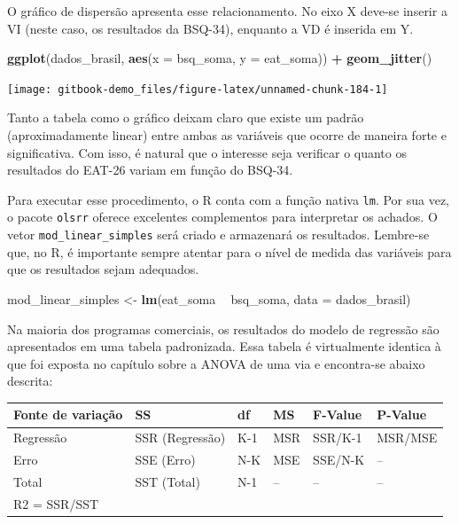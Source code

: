 \documentclass[
]{book}
\newenvironment{Shaded}{\begin{snugshade}}{\end{snugshade}}
\newcommand{\DataTypeTok}[1]{\textcolor[rgb]{0.13,0.29,0.53}{#1}}
\newcommand{\KeywordTok}[1]{\textcolor[rgb]{0.13,0.29,0.53}{\textbf{#1}}}
\newcommand{\NormalTok}[1]{#1}
\newcommand{\OperatorTok}[1]{\textcolor[rgb]{0.81,0.36,0.00}{\textbf{#1}}}
\newcommand{\StringTok}[1]{\textcolor[rgb]{0.31,0.60,0.02}{#1}}
\begin{document}
O gráfico de dispersão apresenta esse relacionamento. No eixo X deve-se inserir a VI (neste caso, os resultados da BSQ-34), enquanto a VD é inserida em Y.

\begin{Shaded}
\begin{Highlighting}[]
\KeywordTok{ggplot}\NormalTok{(dados_brasil, }\KeywordTok{aes}\NormalTok{(}\DataTypeTok{x =}\NormalTok{ bsq_soma, }\DataTypeTok{y =}\NormalTok{ eat_soma)) }\OperatorTok{+}
\StringTok{  }\KeywordTok{geom_jitter}\NormalTok{()}
\end{Highlighting}
\end{Shaded}

\begin{center}\texttt{[image: gitbook-demo\_files/figure-latex/unnamed-chunk-184-1]} \end{center}

Tanto a tabela como o gráfico deixam claro que existe um padrão (aproximadamente linear) entre ambas as variáveis que ocorre de maneira forte e significativa. Com isso, é natural que o interesse seja verificar o quanto os resultados do EAT-26 variam em função do BSQ-34.

Para executar esse procedimento, o R conta com a função nativa \texttt{lm}. Por sua vez, o pacote \texttt{olsrr} oferece excelentes complementos para interpretar os achados. O vetor \texttt{mod\_linear\_simples} será criado e armazenará os resultados. Lembre-se que, no R, é importante sempre atentar para o nível de medida das variáveis para que os resultados sejam adequados.

\begin{Shaded}
\begin{Highlighting}[]
\NormalTok{mod_linear_simples <-}\StringTok{ }\KeywordTok{lm}\NormalTok{(eat_soma }\OperatorTok{~}\StringTok{ }\NormalTok{bsq_soma, }\DataTypeTok{data =}\NormalTok{ dados_brasil)}
\end{Highlighting}
\end{Shaded}

Na maioria dos programas comerciais, os resultados do modelo de regressão são apresentados em uma tabela padronizada. Essa tabela é virtualmente identica à que foi exposta no capítulo sobre a ANOVA de uma via e encontra-se abaixo descrita:

\begin{longtable}[]{@{}llllll@{}}
\toprule
Fonte de variação & SS & df & MS & F-Value & P-Value\tabularnewline
\midrule
\endhead
Regressão & SSR (Regressão) & K-1 & MSR & SSR/K-1 & MSR/MSE\tabularnewline
Erro & SSE (Erro) & N-K & MSE & SSE/N-K & --\tabularnewline
Total & SST (Total) & N-1 & -- & -- & --\tabularnewline
R2 = SSR/SST & & & & &\tabularnewline
\bottomrule
\end{longtable}
\end{document}
